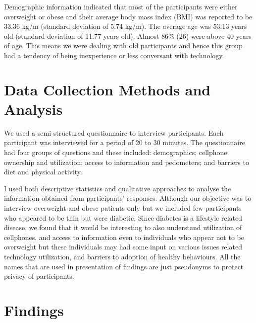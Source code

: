 Demographic information indicated that most of the participants were either overweight or obese and their average body mass index (BMI) was reported to be 33.36 kg/m (standard deviation of 5.74 kg/m). The average age was 53.13 years old (standard deviation of 11.77 years old).  Almost 86\% (26) were above 40 years of age. This means we were dealing with old participants and hence this group had a tendency of being inexperience or less conversant with technology.

\section{Data Collection Methods and Analysis}
We used a semi structured questionnaire to interview participants. Each participant was interviewed for a period of 20 to 30 minutes. The questionnaire had four groups of questions and these included: demographics; cellphone ownership and utilization; access to information and pedometers; and barriers to diet and physical activity. 

I used both descriptive statistics and qualitative approaches to analyse the information obtained from participants’ responses. Although our objective was to interview overweight and obese patients only but we included few participants who appeared to be thin but were diabetic. Since diabetes is a lifestyle related disease, we found that it would be interesting to also understand utilization of cellphones, and access to information even to individuals who appear not to be overweight but these individuals may had some input on various issues related technology utilization, and  barriers to adoption of healthy behaviours. All the names that are used in presentation of findings are just pseudonyms to protect privacy of participants. 
\section{Findings}
